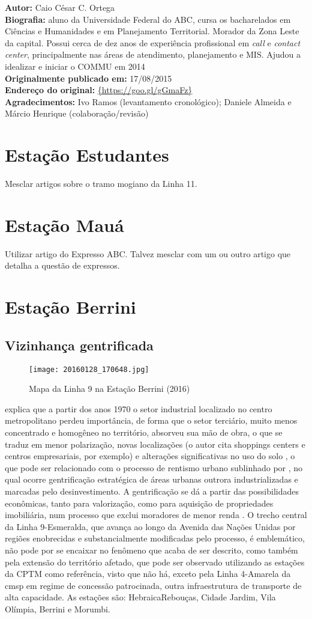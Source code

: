 \documentclass[11pt,fleqn]{book} %
\newcommand{\infocaio}[2]{\textbf{Autor:} Caio C\'{e}sar C. Ortega \\ \textbf{Biografia:} aluno da Universidade Federal do ABC, cursa os bacharelados em Ci\^{e}ncias e Humanidades e em Planejamento Territorial. Morador da Zona Leste da capital. Possui cerca de dez anos de experi\^{e}ncia profissional em \textit{call} e \textit{contact center}, principalmente nas \'{a}reas de atendimento, planejamento e MIS. Ajudou a idealizar e iniciar o COMMU em 2014 \\ \textbf{Originalmente publicado em:} {#1} \\ \textbf{Endere\c{c}o do original:} \url{{#2}}}
\begin{document}
\begin{info}
	\infocaio{17/08/2015}{https://goo.gl/gGmaFz}\\
	\textbf{Agradecimentos:} Ivo Ramos (levantamento cronológico); Daniele Almeida e Márcio Henrique (colaboração/revisão)
\end{info}

\section{Estação Estudantes}

Mesclar artigos sobre o tramo mogiano da Linha 11.

\section{Estação Mauá}

Utilizar artigo do Expresso ABC. Talvez mesclar com um ou outro artigo que detalha a questão de expressos.

\section{Estação Berrini}\label{s:brr}

\subsection{Vizinhança gentrificada}

\begin{wrapfigure}{l}{0.25\textwidth}
	\caption{Mapa da Linha 9 na Estação Berrini (2016)}
	\texttt{[image: 20160128\_170648.jpg]}
\end{wrapfigure}

\cite[pág. 13]{Ferreira} explica que a partir dos anos 1970 o setor industrial localizado no centro metropolitano perdeu importância, de forma que o setor terciário, muito menos concentrado e homogêneo no território, absorveu sua mão de obra, o que se traduz em menor polarização, novas localizações (o autor cita shoppings centers e centros empresariais, por exemplo) e alterações significativas no uso do solo \cite[pág. 25]{Ferreira}, o que pode ser relacionado com o processo de rentismo urbano sublinhado por \cite[pág 30, nota de rodapé 2]{Acselrad}, no qual ocorre gentrificação estratégica de áreas urbanas outrora industrializadas e marcadas pelo desinvestimento. A gentrificação se dá a partir das possibilidades econômicas, tanto para valorização, como para aquisição de propriedades imobiliária, num processo que exclui moradores de menor renda \cite[pág. 28-29]{Acselrad}. O trecho central da Linha 9-Esmeralda, que avança ao longo da Avenida das Nações Unidas por regiões enobrecidas e substancialmente modificadas pelo processo, é emblemático, não pode por se encaixar no fenômeno que acaba de ser descrito, como também pela extensão do território afetado, que pode ser observado utilizando as estações da CPTM como referência, visto que não há, exceto pela Linha 4-Amarela da \gls{cmsp} em regime de concessão patrocinada, outra infraestrutura de transporte de alta capacidade. As estações são: Hebraica\textperiodcentered Rebouças, Cidade Jardim, Vila Olímpia, Berrini e Morumbi.
\end{document}
